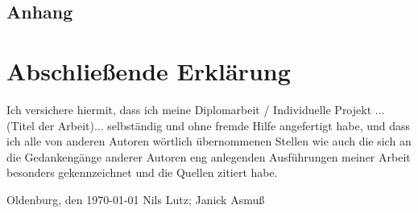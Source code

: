 \begin{appendix}

\section{Anhang}

\newpage
{}

\end{appendix}

\newpage
\section*{Abschließende Erklärung}

Ich versichere hiermit, dass ich meine Diplomarbeit / Individuelle Projekt ...(Titel der Arbeit)... selbständig und ohne fremde Hilfe angefertigt habe, und dass ich alle von anderen Autoren wörtlich übernommenen Stellen wie auch die sich an die Gedankengänge anderer Autoren eng anlegenden Ausführungen meiner Arbeit besonders gekennzeichnet und die Quellen zitiert habe.

\vspace*{3cm}
\noindent Oldenburg, den \today \hspace*{2cm} Nils Lutz; Janick Asmuß